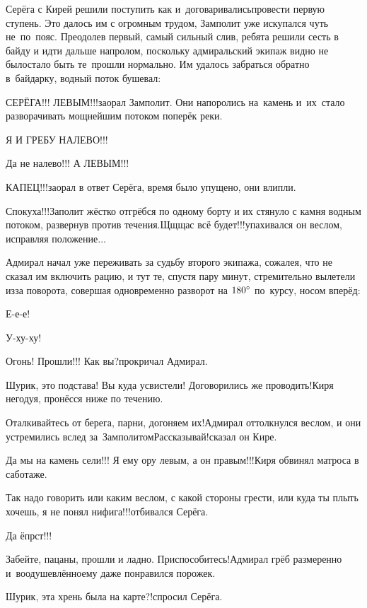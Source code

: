 Серёга с Кирей решили поступить как и~договаривались\mdash провести первую ступень. Это далось им с огромным трудом, Замполит уже искупался чуть не~по~пояс. Преодолев первый, самый сильный слив, ребята решили сесть в байду и идти дальше напролом, поскольку адмиральский экипаж видно не было\mdash стало быть те~прошли нормально. Им удалось забраться обратно в~байдарку, водный поток бушевал:

\diagdash СЕРЁГА!!! ЛЕВЫМ!!!\mdash заорал Замполит. Они напоролись на~камень и~их~стало разворачивать мощнейшим потоком поперёк реки.

\diagdash Я И ГРЕБУ НАЛЕВО!!!

\diagdash Да не налево!!! А ЛЕВЫМ!!!

\diagdash КАПЕЦ!!!\mdash заорал в ответ Серёга, время было упущено, они влипли.

\diagdash Спокуха!!!\mdash Заполит жёстко отгрёбся по одному борту и их стянуло с камня водным потоком, развернув против течения.\mdash Щ\sdash щ\sdash щас всё будет!!!\mdash упахивался он веслом, исправляя положение$\ldots$

Адмирал начал уже переживать за судьбу второго экипажа, сожалея, что не сказал им включить рацию, и тут те, спустя пару минут, стремительно вылетели из\sdash за поворота, совершая одновременно разворот на $180\degree$ по~курсу, носом вперёд:

\diagdash Е-е-е!

\diagdash У-ху-ху!

\diagdash Огонь! Прошли!!! Как вы?\mdash прокричал Адмирал.

\diagdash Шурик, это подстава! Вы куда усвистели! Договорились же проводить!\mdash Киря негодуя, пронёсся ниже по течению.

\diagdash Оталкивайтесь от берега, парни, догоняем их!\mdash Адмирал оттолкнулся веслом, и они устремились вслед за~Замполитом\mdash Рассказывай!\mdash сказал он Кире.

\diagdash Да мы на камень сели!!! Я ему ору левым, а он правым!!!\mdash Киря обвинял матроса в саботаже.

\diagdash Так надо говорить или каким веслом, с какой стороны грести, или куда ты плыть хочешь, я не понял нифига!!!\mdash отбивался Серёга.

\diagdash Да ёпрст!!!

\diagdash Забейте, пацаны, прошли и ладно. Приспособитесь!\mdash Адмирал грёб размеренно и~воодушевлённо\mdash ему даже понравился порожек.

\diagdash Шурик, эта хрень была на карте?!\mdash спросил Серёга.

